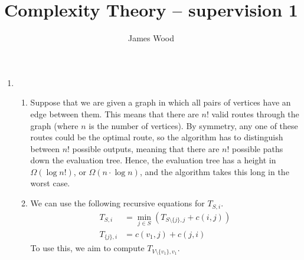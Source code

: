 \documentclass{article}
\begin{document}
\title{Complexity Theory -- supervision 1}
\author{James Wood}
\maketitle

\begin{enumerate}
  \item
    \begin{enumerate}[label=\arabic{enumii}.]
      \item Suppose that we are given a graph in which all pairs of vertices have an edge between them. This means that there are $n!$ valid routes through the graph (where $n$ is the number of vertices). By symmetry, any one of these routes could be the optimal route, so the algorithm has to distinguish between $n!$ possible outputs, meaning that there are $n!$ possible paths down the evaluation tree. Hence, the evaluation tree has a height in $\Omega(\log n!)$, or $\Omega(n \cdot \log n)$, and the algorithm takes this long in the worst case.
      \item We can use the following recursive equations for $T_{S,i}$.
        \begin{align*}
          T_{S,i} & =
          \min_{j \in S}\left(T_{S \setminus \{j\},j} + c(i,j)\right)
          \\
          T_{\{j\},i} & = c(v_1,j) + c(j,i)
        \end{align*}
        To use this, we aim to compute $T_{V \setminus \{v_1\},v_1}$.


\end{enumerate}
\end{enumerate}
\end{document}
